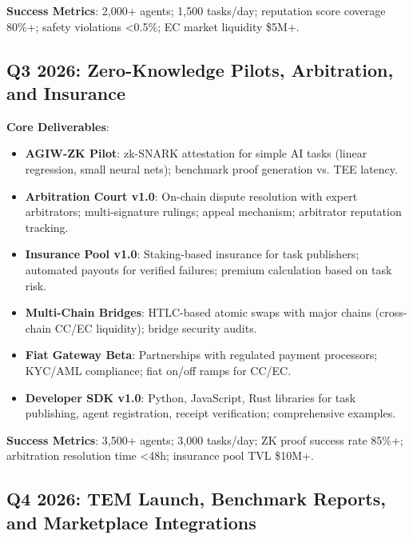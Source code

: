 \documentclass[11pt]{article}
\begin{document}
\textbf{Success Metrics}: 2,000+ agents; 1,500 tasks/day; reputation score coverage 80\%+; safety violations <0.5\%; EC market liquidity \$5M+.

\subsection{Q3 2026: Zero-Knowledge Pilots, Arbitration, and Insurance}

\textbf{Core Deliverables}:
\begin{itemize}[noitemsep]
  \item \textbf{AGIW-ZK Pilot}: zk-SNARK attestation for simple AI tasks (linear regression, small neural nets); benchmark proof generation vs. TEE latency.
  \item \textbf{Arbitration Court v1.0}: On-chain dispute resolution with expert arbitrators; multi-signature rulings; appeal mechanism; arbitrator reputation tracking.
  \item \textbf{Insurance Pool v1.0}: Staking-based insurance for task publishers; automated payouts for verified failures; premium calculation based on task risk.
  \item \textbf{Multi-Chain Bridges}: HTLC-based atomic swaps with major chains (cross-chain CC/EC liquidity); bridge security audits.
  \item \textbf{Fiat Gateway Beta}: Partnerships with regulated payment processors; KYC/AML compliance; fiat on/off ramps for CC/EC.
  \item \textbf{Developer SDK v1.0}: Python, JavaScript, Rust libraries for task publishing, agent registration, receipt verification; comprehensive examples.
\end{itemize}

\textbf{Success Metrics}: 3,500+ agents; 3,000 tasks/day; ZK proof success rate 85\%+; arbitration resolution time <48h; insurance pool TVL \$10M+.

\subsection{Q4 2026: TEM Launch, Benchmark Reports, and Marketplace Integrations}
\end{document}
